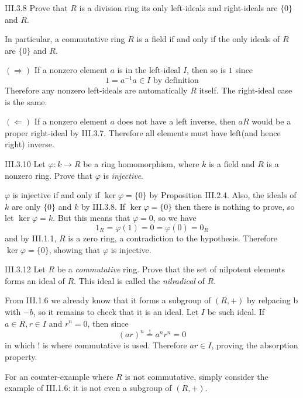 \begin{problem}{III.3.8}
Prove that $R$ is a division ring \iffw its only left-ideals and right-ideals are $\{0\}$ and $R$.

In particular, a commutative ring $R$ is a field if and only if the only ideals of $R$ are $\{0\}$ and $R$.
\end{problem}
\begin{pf}

\noindent $(\Rightarrow)$ If a nonzero element $a$ is in the left-ideal $I$, then so is $1$ since 
\[
1 = a^{-1}a \in I \text{ by definition}
\] 
Therefore any nonzero left-ideals are automatically $R$ itself. The right-ideal case is the same.

\noindent $(\Leftarrow)$ If a nonzero element $a$ does not have a left inverse, then $aR$ would be a proper right-ideal by III.3.7. Therefore all elements must have left(and hence right) inverse.
\end{pf}

\begin{problem}{III.3.10}
Let $\varphi : k \to R$ be a ring homomorphism, where $k$ is a field and $R$ is a nonzero ring. Prove that $\varphi$ is \emph{injective}.
\end{problem}
\begin{pf}
$\varphi$ is injective if and only if $\ker \varphi = \{0\}$ by Proposition III.2.4. Also, the ideals of $k$ are only $\{0\}$ and $k$ by III.3.8. If $\ker \varphi = \{0\}$ then there is nothing to prove, so let $\ker \varphi = k$. But this means that $\varphi = 0$, so we have
\[
1_R = \varphi(1) = 0 = \varphi(0) = 0_R    
\]
and by III.1.1, $R$ is a zero ring, a contradiction to the hypothesis. Therefore $\ker \varphi = \{0\}$, showing that $\varphi$ is injective.
\end{pf}


\begin{problem}{III.3.12}
Let $R$ be a \emph{commutative} ring. Prove that the set of nilpotent elements forms an ideal of $R$. This ideal is called the \emph{nilradical} of $R$.
\end{problem}
\begin{pf}
From III.1.6 we already know that it forms a subgroup of $(R,+)$ by relpacing b with $-b$, so it remains to check that it is an ideal. Let $I$ be such ideal. If $a \in R, r \in I$ and $r^n = 0$, then since
\[
(ar)^n \overset{!}{=} a^nr^n = 0    
\]
in which ! is where commutative is used. Therefore $ar \in I$, proving the absorption property.

For an counter-example where $R$ is not commutative, simply consider the example of III.1.6: it is not even a subgroup of $(R, +)$.
\end{pf}

